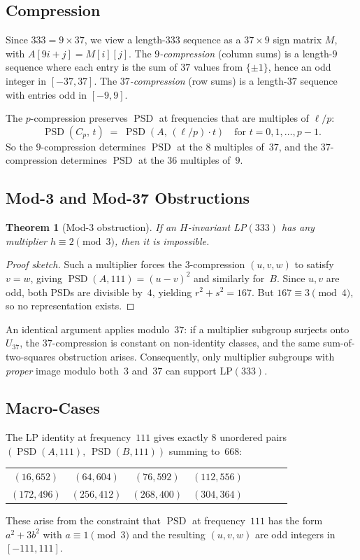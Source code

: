 \documentclass[11pt,a4paper]{article}
\newcommand{\PSD}{\operatorname{PSD}}
\theoremstyle{plain}
\newtheorem{theorem}{Theorem}
\theoremstyle{definition}
\theoremstyle{remark}
\begin{document}
\subsection{Compression}
Since $333=9\times37$, we view a length-$333$ sequence as a $37\times9$ sign matrix $M$, with $A[9i+j]=M[i][j]$. The \emph{$9$-compression} (column sums) is a length-$9$ sequence where each entry is the sum of $37$ values from $\{\pm1\}$, hence an odd integer in $[-37,37]$. The \emph{$37$-compression} (row sums) is a length-$37$ sequence with entries odd in $[-9,9]$.

The $p$-compression preserves $\PSD$ at frequencies that are multiples of $\ell/p$:
\[
\PSD(C_p,\,t)\;=\;\PSD(A,\,(\ell/p)\cdot t)\quad\text{for }t=0,1,\dots,p-1.
\]
So the $9$-compression determines $\PSD$ at the $8$ multiples of~$37$, and the $37$-compression determines $\PSD$ at the $36$ multiples of~$9$.

\subsection{Mod-3 and Mod-37 Obstructions}

\begin{theorem}[Mod-3 obstruction]
If an $H$-invariant LP$(333)$ has any multiplier $h\equiv2\pmod{3}$, then it is impossible.
\end{theorem}

\begin{proof}[Proof sketch]
Such a multiplier forces the $3$-compression $(u,v,w)$ to satisfy $v=w$, giving $\PSD(A,111)=(u-v)^2$ and similarly for~$B$. Since $u,v$ are odd, both PSDs are divisible by~$4$, yielding $r^2+s^2=167$. But $167\equiv3\pmod{4}$, so no representation exists.
\end{proof}

An identical argument applies modulo~$37$: if a multiplier subgroup surjects onto~$U_{37}$, the $37$-compression is constant on non-identity classes, and the same sum-of-two-squares obstruction arises. Consequently, only multiplier subgroups with \emph{proper} image modulo both~$3$ and~$37$ can support LP$(333)$.

\subsection{Macro-Cases}
The LP identity at frequency~$111$ gives exactly $8$ unordered pairs $(\PSD(A,111),\,\PSD(B,111))$ summing to~$668$:
\begin{center}
\begin{tabular}{cccccccc}
\toprule
$(16,652)$ & $(64,604)$ & $(76,592)$ & $(112,556)$ \\
$(172,496)$ & $(256,412)$ & $(268,400)$ & $(304,364)$ \\
\bottomrule
\end{tabular}
\end{center}
These arise from the constraint that $\PSD$ at frequency~$111$ has the form $a^2+3b^2$ with $a\equiv1\pmod{3}$ and the resulting $(u,v,w)$ are odd integers in $[-111,111]$.
\end{document}
